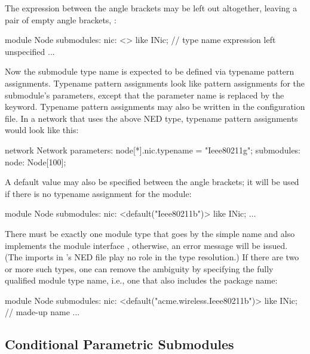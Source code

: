The expression between the angle brackets may be left out altogether, leaving a
pair of empty angle brackets, \ttt{<>}:

\begin{ned}
module Node
{
    submodules:
        nic: <> like INic;  // type name expression left unspecified
        ...
}
\end{ned}

Now the submodule type name is expected to be defined via typename pattern
assignments. Typename pattern assignments look like pattern assignments for the
submodule's parameters, except that the parameter name is replaced by the
 keyword. Typename pattern assignments may also be written in
the configuration file. In a network that uses the above  NED type,
typename pattern assignments would look like this:

\begin{ned}
network Network
{
    parameters:
        node[*].nic.typename = "Ieee80211g";
    submodules:
        node: Node[100];
}
\end{ned}

A default value may also be specified between the angle brackets; it will be
used if there is no typename assignment for the module:

\begin{ned}
module Node
{
    submodules:
        nic: <default("Ieee80211b")> like INic;
        ...
}
\end{ned}

There must be exactly one module type that goes by the simple name
 and also implements the module interface , otherwise,
an error message will be issued. (The imports in 's NED file play no
role in the type resolution.) If there are two or more such types, one can
remove the ambiguity by specifying the fully qualified module type name, i.e.,
one that also includes the package name:

\begin{ned}
module Node
{
    submodules:
        nic: <default("acme.wireless.Ieee80211b")> like INic; // made-up name
        ...
}
\end{ned}

\subsection{Conditional Parametric Submodules}
\label{sec:ned-lang:conditional-parametric-submodules}

